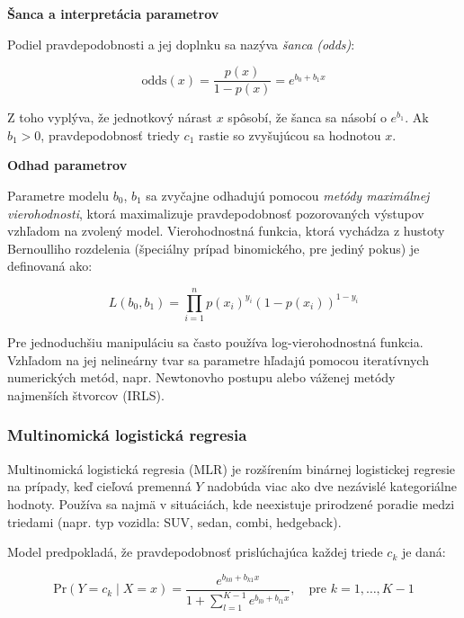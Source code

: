 \textbf{Šanca a interpretácia parametrov}

Podiel pravdepodobnosti a jej doplnku sa nazýva \textit{šanca (odds)}:

\begin{equation}
\text{odds}(x) = \frac{p(x)}{1 - p(x)} = e^{b_0 + b_1 x}
\end{equation}

Z toho vyplýva, že jednotkový nárast $x$ spôsobí, že šanca sa násobí o $e^{b_1}$. Ak $b_1 > 0$, pravdepodobnosť triedy $c_1$ rastie so zvyšujúcou sa hodnotou $x$.

\textbf{Odhad parametrov}

Parametre modelu $b_0$, $b_1$ sa zvyčajne odhadujú pomocou \textit{metódy maximálnej vierohodnosti}, ktorá maximalizuje pravdepodobnosť pozorovaných výstupov vzhľadom na zvolený model. Vierohodnostná funkcia, ktorá vychádza z hustoty Bernoulliho rozdelenia (špeciálny prípad binomického, pre jediný pokus) je definovaná ako:

\begin{equation}
L(b_0, b_1) = \prod_{i=1}^{n} p(x_i)^{y_i} (1 - p(x_i))^{1 - y_i}
\end{equation}

Pre jednoduchšiu manipuláciu sa často používa log-vierohodnostná funkcia. Vzhľadom na jej nelineárny tvar sa parametre hľadajú pomocou iteratívnych numerických metód, napr. Newtonovho postupu alebo váženej metódy najmenších štvorcov (IRLS).

\subsubsection{Multinomická logistická regresia}
\label{subsubsec:multinom_log_reg}

Multinomická logistická regresia (MLR) je rozšírením binárnej logistickej regresie na prípady, keď cieľová premenná $Y$ nadobúda viac ako dve nezávislé kategoriálne hodnoty. Používa sa najmä v situáciách, kde neexistuje prirodzené poradie medzi triedami (napr. typ vozidla: SUV, sedan, combi, hedgeback).

Model predpokladá, že pravdepodobnosť prislúchajúca každej triede $c_k$ je daná:

\begin{equation}
\mathrm{Pr}(Y = c_k \mid X = x) = \frac{e^{b_{k0} + b_{k1} x}}{1 + \sum\limits_{l=1}^{K-1} e^{b_{l0} + b_{l1} x}}, \quad \text{pre } k = 1, \dots, K-1
\end{equation}

